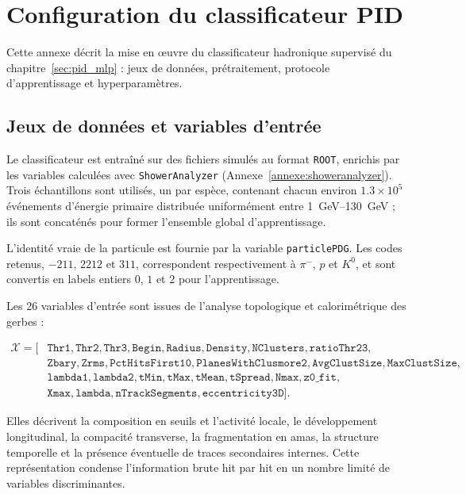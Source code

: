 \chapter{Configuration du classificateur PID}
\label{app:pid_lgbm}

Cette annexe décrit la mise en œuvre du classificateur hadronique supervisé du
chapitre~\ref{sec:pid_mlp} : jeux de données, prétraitement, protocole d'apprentissage et
hyperparamètres.

\section{Jeux de données et variables d'entrée}
\label{app:pid_data}

Le classificateur est entraîné sur des fichiers simulés au format \texttt{ROOT}, enrichis par les variables calculées avec \texttt{ShowerAnalyzer} (Annexe~\ref{annexe:showeranalyzer}). Trois échantillons sont utilisés, un par espèce, contenant chacun environ \(1.3\times 10^5\) événements d'énergie primaire distribuée uniformément entre \SIrange{1}{130}{GeV} ; ils sont concaténés pour former l'ensemble global d'apprentissage.

L'identité vraie de la particule est fournie par la variable \texttt{particlePDG}. Les codes retenus, \(-211\), \(2212\) et \(311\), correspondent respectivement à \(\pi^-\), \(p\) et \(K^0\), et sont convertis en labels entiers \(0\), \(1\) et \(2\) pour l'apprentissage.

Les 26 variables d'entrée sont issues de l'analyse topologique et calorimétrique des gerbes :

\begin{align*}
\mathcal{X} = \big[
&\texttt{Thr1},\texttt{Thr2},\texttt{Thr3},\texttt{Begin},\texttt{Radius},\texttt{Density},
\texttt{NClusters},\texttt{ratioThr23},\\
&\texttt{Zbary},\texttt{Zrms},
\texttt{PctHitsFirst10},\texttt{PlanesWithClusmore2},
\texttt{AvgClustSize},\texttt{MaxClustSize},\\
&\texttt{lambda1},\texttt{lambda2},
\texttt{tMin},\texttt{tMax},\texttt{tMean},\texttt{tSpread},
\texttt{Nmax},\texttt{z0\_fit},\\
&\texttt{Xmax},\texttt{lambda},
\texttt{nTrackSegments},\texttt{eccentricity3D}
\big].
\end{align*}

Elles décrivent la composition en seuils et l'activité locale, le développement longitudinal, la compacité transverse, la fragmentation en amas, la structure temporelle et la présence éventuelle de traces secondaires internes. Cette représentation condense l'information brute hit par hit en un nombre limité de variables discriminantes.

